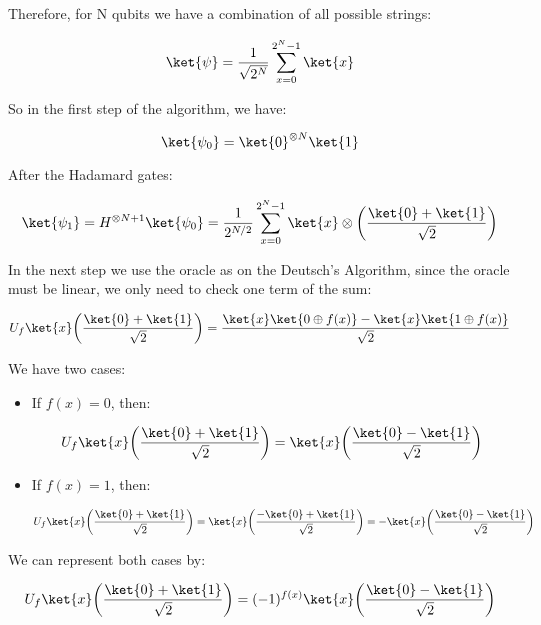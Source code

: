 Therefore, for N qubits we have a combination of all possible strings:

\begin{equation}
    \ket{\psi} = \frac{1}{\sqrt{2^N}} \sum_{x=0}^{2^N -1} \ket{x}
\end{equation}

So in the first step of the algorithm, we have:

\begin{equation}
    \ket{\psi_0} = \ket{0}^{\otimes N} \ket{1}
\end{equation}

After the Hadamard gates:

\begin{equation}
    \ket{\psi_1} = H^{\otimes N+1} \ket{\psi_0} = \frac{1}{2^{N/2}} \sum_{x=0}^{2^N -1} \ket{x} \otimes \bigg( \frac{ \ket{0} + \ket{1}}{\sqrt{2}} \bigg)
\end{equation}

In the next step we use the oracle as on the Deutsch's Algorithm, since the oracle must be linear, we only need to check one term of the sum:

\begin{equation}
    U_f \ket{x}\bigg( \frac{ \ket{0} + \ket{1}}{\sqrt{2}} \bigg) = \frac{\ket{x}\ket{0 \oplus f(x)} - \ket{x}\ket{1 \oplus f(x)}}{\sqrt{2}}
\end{equation}

We have two cases:
\begin{itemize}
    \item If $f(x)=0$, then:

\begin{equation}
    U_f \ket{x}\bigg( \frac{ \ket{0} + \ket{1}}{\sqrt{2}} \bigg) =  \ket{x}\bigg( \frac{ \ket{0} - \ket{1}}{\sqrt{2}} \bigg) 
\end{equation}

    \item If $f(x)=1$, then:

\begin{equation}
    U_f \ket{x}\bigg( \frac{ \ket{0} + \ket{1}}{\sqrt{2}} \bigg) =  \ket{x}\bigg( \frac{- \ket{0} + \ket{1}}{\sqrt{2}} \bigg) = - \ket{x}\bigg( \frac{ \ket{0} - \ket{1}}{\sqrt{2}} \bigg)
\end{equation}
\end{itemize}

We can represent both cases by:

\begin{equation}
    U_f \ket{x}\bigg( \frac{ \ket{0} + \ket{1}}{\sqrt{2}} \bigg) = (-1)^{f(x)} \ket{x}\bigg( \frac{ \ket{0} - \ket{1}}{\sqrt{2}} \bigg)
\end{equation}

